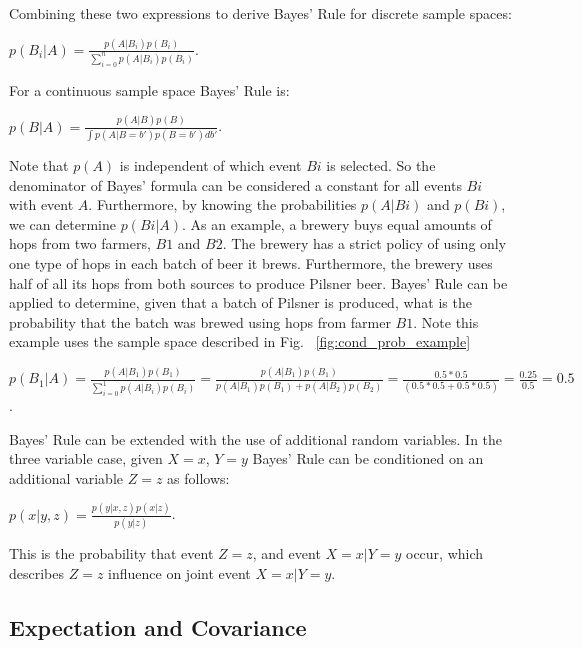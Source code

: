 \documentclass[twoside]{article}
\begin{document}
Combining these two expressions to derive Bayes' Rule for discrete sample spaces:

\begin{center}
$p(B_i|A)= \frac{p(A|B_i)p(B_i)}{\sum\limits_{i = 0}^{n} p(A|B_i)p(B_i)}$.
\end{center}

For a continuous sample space Bayes' Rule is:

\begin{center}
$p(B|A)= \frac{p(A|B)p(B)}{\int p(A|B = b')p(B = b')db'}$.
\end{center}

Note that $p(A)$ is independent of which event $Bi$ is selected. So the denominator of Bayes' formula can be considered a constant for all events $Bi$ with event $A$. Furthermore, by knowing the probabilities $p(A|Bi)$ and $p(Bi)$, we can determine $p(Bi|A)$. As an example, a brewery buys equal amounts of hops from two farmers, $B1$ and $B2$. The brewery has a strict policy of using only one type of hops in each batch of beer it brews. Furthermore, the brewery uses half of all its hops from both sources to produce Pilsner beer. Bayes' Rule can be applied to determine, given that a batch of Pilsner is produced, what is the probability that the batch was brewed using hops from farmer $B1$. Note this example uses the sample space described in Fig. ~\ref{fig:cond_prob_example}\

\begin{center}
$p(B_1|A)= \frac{p(A|B_1)p(B_1)}{\sum\limits_{i = 0}^{1} p(A|B_i)p(B_i)} = \frac{p(A|B_1)p(B_1)}{p(A|B_1)p(B_1) + p(A|B_2)p(B_2)} = \frac{0.5*0.5}{(0.5*0.5 + 0.5*0.5)} = \frac{0.25}{0.5} = 0.5$.
\end{center}

Bayes' Rule can be extended with the use of additional random variables. In the three variable case, given $X=x$, $Y=y$ Bayes' Rule can be conditioned on an additional variable $Z=z$ as follows:

\begin{center}
$p(x|y, z)= \frac{p(y|x,z)p(x|z)}{p(y|z)}$.
\end{center}

This is the probability that event $Z=z$, and event $X=x|Y=y$ occur, which describes $Z=z$ influence on joint event $X=x|Y=y$.

\subsection{Expectation and Covariance}
\end{document}
